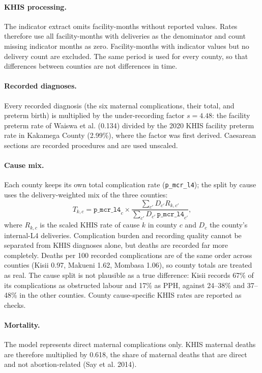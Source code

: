 \documentclass[11pt]{article}
\newcommand{\p}[1]{\texttt{#1}}
\begin{document}
\paragraph{KHIS processing.} The indicator extract omits facility-months without
reported values. Rates therefore use all facility-months with deliveries as the
denominator and count missing indicator months as zero. Facility-months with
indicator values but no delivery count are excluded. The same period is used
for every county, so that differences between counties are not differences in
time.

\paragraph{Recorded diagnoses.} Every recorded diagnosis (the six maternal
complications, their total, and preterm birth) is multiplied by the
under-recording factor $s=4.48$: the facility preterm rate of Waiswa et al.
(0.134) divided by the 2020 KHIS facility preterm rate in Kakamega County
(2.99\%), where the factor was first derived. Caesarean sections are recorded procedures and are used unscaled.

\paragraph{Cause mix.} Each county keeps its own total complication rate
(\p{p\_mcr\_l4}); the split by cause uses the delivery-weighted mix of the
three counties:
\begin{equation}
T_{k,c}=\p{p\_mcr\_l4}_c\times
\frac{\sum_{c'}D_{c'}R_{k,c'}}{\sum_{c'}D_{c'}\,\p{p\_mcr\_l4}_{c'}},
\end{equation}
where $R_{k,c}$ is the scaled KHIS rate of cause $k$ in county $c$ and $D_c$ the
county's internal-L4 deliveries. Complication burden and recording quality
cannot be separated from KHIS diagnoses alone, but deaths are recorded far more
completely. Deaths per 100 recorded complications are of the same order across
counties (Kisii 0.97, Makueni 1.62, Mombasa 1.06), so county totals are treated
as real. The cause split is not plausible as a true difference: Kisii records 67\% of
its complications as obstructed labour and 17\% as PPH, against 24--38\% and
37--48\% in the other counties. County cause-specific KHIS rates are reported as
checks.

\paragraph{Mortality.} The model represents direct maternal complications only.
KHIS maternal deaths are therefore multiplied by 0.618, the share of maternal
deaths that are direct and not abortion-related (Say et al. 2014).
\end{document}
